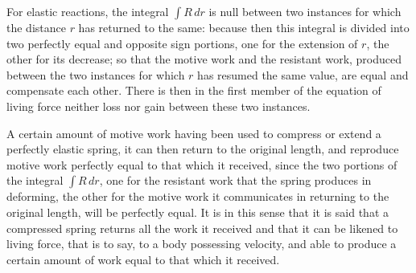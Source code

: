 \documentclass{book}
\begin{document}
For elastic reactions, the integral \( \int R \, dr \) is null between two instances for which the distance \( r \) has returned to the same: because then this integral is divided into two perfectly equal and opposite sign portions, one for the extension of \( r \), the other for its decrease; so that the motive work and the resistant work, produced between the two instances for which \( r \) has resumed the same value, are equal and compensate each other. There is then in the first member of the equation of living force neither loss nor gain between these two instances.

A certain amount of motive work having been used to compress or extend a perfectly elastic spring, it can then return to the original length, and reproduce motive work perfectly equal to that which it received, since the two portions of the integral \( \int R \, dr \), one for the resistant work that the spring produces in deforming, the other for the motive work it communicates in returning to the original length, will be perfectly equal. It is in this sense that it is said that a compressed spring returns all the work it received and that it can be likened to living force, that is to say, to a body possessing velocity, and able to produce a certain amount of work equal to that which it received.
\end{document}
